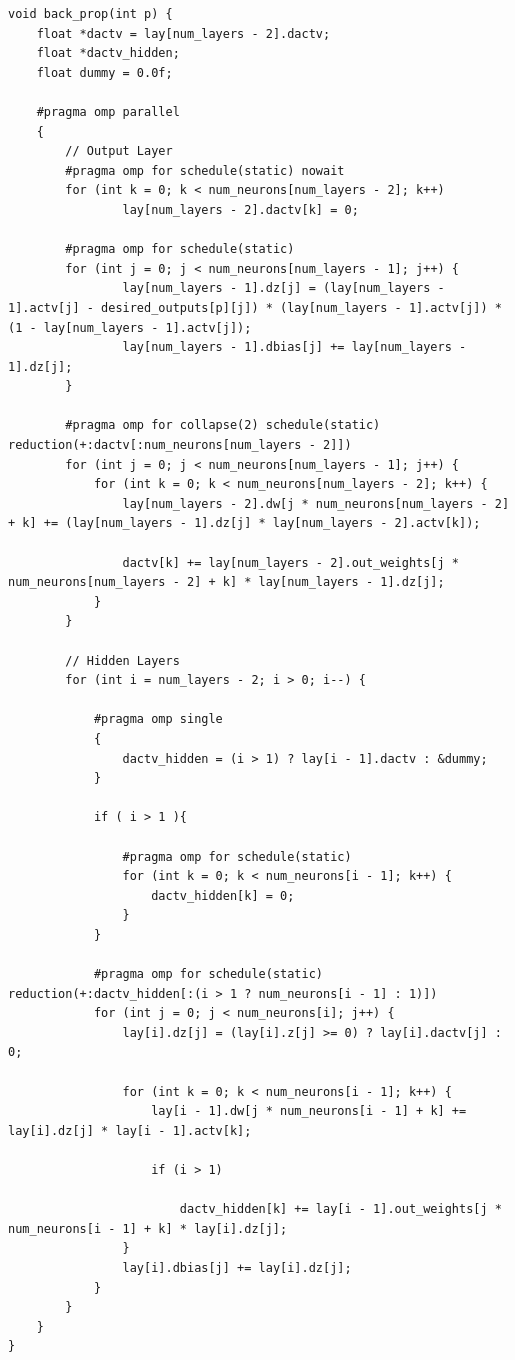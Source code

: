 \documentclass{article}
\begin{document}
\begin{lstlisting}
void back_prop(int p) {
    float *dactv = lay[num_layers - 2].dactv;
    float *dactv_hidden;
    float dummy = 0.0f;

    #pragma omp parallel
    {
        // Output Layer
        #pragma omp for schedule(static) nowait
        for (int k = 0; k < num_neurons[num_layers - 2]; k++)
                lay[num_layers - 2].dactv[k] = 0;

        #pragma omp for schedule(static)
        for (int j = 0; j < num_neurons[num_layers - 1]; j++) {
                lay[num_layers - 1].dz[j] = (lay[num_layers - 1].actv[j] - desired_outputs[p][j]) * (lay[num_layers - 1].actv[j]) * (1 - lay[num_layers - 1].actv[j]);
                lay[num_layers - 1].dbias[j] += lay[num_layers - 1].dz[j];
        }

        #pragma omp for collapse(2) schedule(static) reduction(+:dactv[:num_neurons[num_layers - 2]])
        for (int j = 0; j < num_neurons[num_layers - 1]; j++) {
            for (int k = 0; k < num_neurons[num_layers - 2]; k++) {
                lay[num_layers - 2].dw[j * num_neurons[num_layers - 2] + k] += (lay[num_layers - 1].dz[j] * lay[num_layers - 2].actv[k]);
                
                dactv[k] += lay[num_layers - 2].out_weights[j * num_neurons[num_layers - 2] + k] * lay[num_layers - 1].dz[j];
            }
        }

        // Hidden Layers
        for (int i = num_layers - 2; i > 0; i--) {
            
            #pragma omp single
            {
                dactv_hidden = (i > 1) ? lay[i - 1].dactv : &dummy;
            }

            if ( i > 1 ){

                #pragma omp for schedule(static)
                for (int k = 0; k < num_neurons[i - 1]; k++) {
                    dactv_hidden[k] = 0;
                }
            }

            #pragma omp for schedule(static) reduction(+:dactv_hidden[:(i > 1 ? num_neurons[i - 1] : 1)])
            for (int j = 0; j < num_neurons[i]; j++) {
                lay[i].dz[j] = (lay[i].z[j] >= 0) ? lay[i].dactv[j] : 0;

                for (int k = 0; k < num_neurons[i - 1]; k++) {
                    lay[i - 1].dw[j * num_neurons[i - 1] + k] += lay[i].dz[j] * lay[i - 1].actv[k];

                    if (i > 1)

                        dactv_hidden[k] += lay[i - 1].out_weights[j * num_neurons[i - 1] + k] * lay[i].dz[j];
                }
                lay[i].dbias[j] += lay[i].dz[j];
            }
        }
    }
}
\end{lstlisting}
\end{document}
